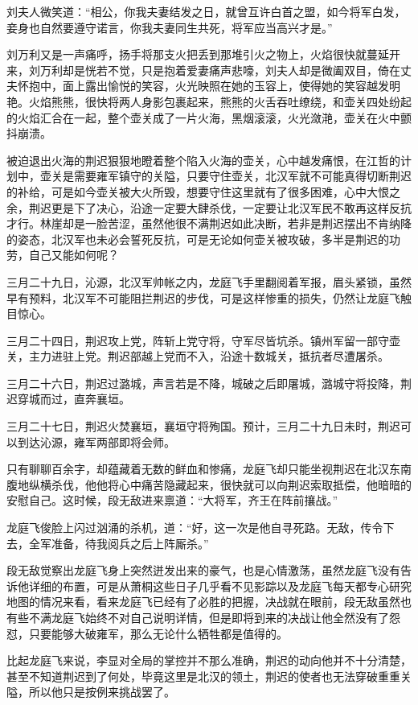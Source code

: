 刘夫人微笑道：“相公，你我夫妻结发之日，就曾互许白首之盟，如今将军白发，妾身也自然要遵守诺言，你我夫妻同生共死，将军应当高兴才是。”

刘万利又是一声痛呼，扬手将那支火把丢到那堆引火之物上，火焰很快就蔓延开来，刘万利却是恍若不觉，只是抱着爱妻痛声悲嚎，刘夫人却是微阖双目，倚在丈夫怀抱中，面上露出愉悦的笑容，火光映照在她的玉容上，使得她的笑容越发明艳。火焰熊熊，很快将两人身影包裹起来，熊熊的火舌吞吐缭绕，和壶关四处纷起的火焰汇合在一起，整个壶关成了一片火海，黑烟滚滚，火光潋滟，壶关在火中颤抖崩溃。

被迫退出火海的荆迟狠狠地瞪着整个陷入火海的壶关，心中越发痛恨，在江哲的计划中，壶关是需要雍军镇守的关隘，只要守住壶关，北汉军就不可能真得切断荆迟的补给，可是如今壶关被大火所毁，想要守住这里就有了很多困难，心中大恨之余，荆迟更是下了决心，沿途一定要大肆杀伐，一定要让北汉军民不敢再这样反抗才行。林崖却是一脸苦涩，虽然他很不满荆迟如此决断，若非是荆迟摆出不肯纳降的姿态，北汉军也未必会誓死反抗，可是无论如何壶关被攻破，多半是荆迟的功劳，自己又能如何呢？

三月二十九日，沁源，北汉军帅帐之内，龙庭飞手里翻阅着军报，眉头紧锁，虽然早有预料，北汉军不可能阻拦荆迟的步伐，可是这样惨重的损失，仍然让龙庭飞触目惊心。

三月二十四日，荆迟攻上党，阵斩上党守将，守军尽皆坑杀。镇州军留一部守壶关，主力进驻上党。荆迟部越上党而不入，沿途十数城关，抵抗者尽遭屠杀。

三月二十六日，荆迟过潞城，声言若是不降，城破之后即屠城，潞城守将投降，荆迟穿城而过，直奔襄垣。

三月二十七日，荆迟火焚襄垣，襄垣守将殉国。预计，三月二十九日未时，荆迟可以到达沁源，雍军两部即将会师。

只有聊聊百余字，却蕴藏着无数的鲜血和惨痛，龙庭飞却只能坐视荆迟在北汉东南腹地纵横杀伐，他他将心中痛苦隐藏起来，很快就可以向荆迟索取抵偿，他暗暗的安慰自己。这时候，段无敌进来禀道：“大将军，齐王在阵前攘战。”

龙庭飞俊脸上闪过汹涌的杀机，道：“好，这一次是他自寻死路。无敌，传令下去，全军准备，待我阅兵之后上阵厮杀。”

段无敌觉察出龙庭飞身上突然迸发出来的豪气，也是心情激荡，虽然龙庭飞没有告诉他详细的布置，可是从萧桐这些日子几乎看不见影踪以及龙庭飞每天都专心研究地图的情况来看，看来龙庭飞已经有了必胜的把握，决战就在眼前，段无敌虽然也有些不满龙庭飞始终不对自己说明详情，但是即将到来的决战让他全然没有了怨怼，只要能够大破雍军，那么无论什么牺牲都是值得的。

比起龙庭飞来说，李显对全局的掌控并不那么准确，荆迟的动向他并不十分清楚，甚至不知道荆迟到了何处，毕竟这里是北汉的领土，荆迟的使者也无法穿破重重关隘，所以他只是按例来挑战罢了。

